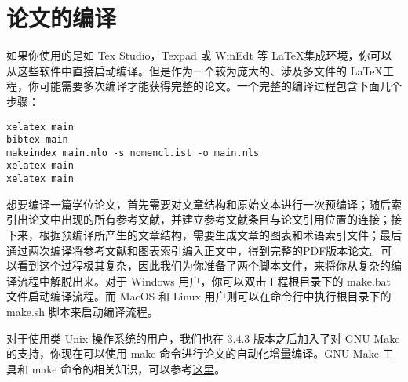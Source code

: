 \section{论文的编译}
\label{sec:compilation}

如果你使用的是如 Tex Studio，Texpad 或 WinEdt 等 \LaTeX 集成环境，你可以从这些软件中直接启动编译。但是作为一个较为庞大的、涉及多文件的 \LaTeX 工程，你可能需要多次编译才能获得完整的论文。一个完整的编译过程包含下面几个步骤：

\begin{tcolorbox}
\begin{lstlisting}
xelatex main
bibtex main
makeindex main.nlo -s nomencl.ist -o main.nls
xelatex main
xelatex main
\end{lstlisting}
\end{tcolorbox}

\noindent 想要编译一篇学位论文，首先需要对文章结构和原始文本进行一次预编译；随后索引出论文中出现的所有参考文献，并建立参考文献条目与论文引用位置的连接；接下来，根据预编译所产生的文章结构，需要生成文章的图表和术语索引文件；最后通过两次编译将参考文献和图表索引编入正文中，得到完整的PDF版本论文。可以看到这个过程极其复杂，因此我们为你准备了两个脚本文件，来将你从复杂的编译流程中解脱出来。对于 Windows 用户，你可以双击工程根目录下的 make.bat 文件启动编译流程。而 MacOS 和 Linux 用户则可以在命令行中执行根目录下的 make.sh 脚本来启动编译流程。

对于使用类 Unix 操作系统的用户，我们也在 3.4.3 版本之后加入了对 GNU Make 的支持，你现在可以使用 make 命令进行论文的自动化增量编译。GNU Make 工具和 make 命令的相关知识，可以参考\href{https://www.gnu.org/software/make/manual/make.html}{这里}。

